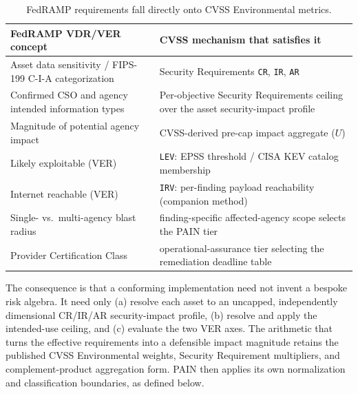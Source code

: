 \documentclass[11pt]{article}
\newcommand{\code}[1]{\texttt{#1}}
\begin{document}
\begin{table}[H]
\centering
\renewcommand{\arraystretch}{1.25}
\begin{tabular}{>{\raggedright\arraybackslash}p{} >{\raggedright\arraybackslash}p{}}
\toprule
\textbf{FedRAMP VDR/VER concept} & \textbf{CVSS mechanism that satisfies it} \\
\midrule
Asset data sensitivity / FIPS-199 C-I-A categorization & Security Requirements
\code{CR}, \code{IR}, \code{AR} \\
Confirmed CSO and agency intended information types & Per-objective Security
Requirements ceiling over the asset security-impact profile \\
Magnitude of potential agency impact & CVSS-derived pre-cap impact aggregate ($U$) \\
Likely exploitable (VER) & \code{LEV}: EPSS threshold / CISA KEV catalog membership \\
Internet reachable (VER) & \code{IRV}: per-finding payload reachability (companion method) \\
Single- vs.\ multi-agency blast radius & finding-specific affected-agency scope
selects the PAIN tier \\
Provider Certification Class & operational-assurance tier selecting the remediation
deadline table \\
\bottomrule
\end{tabular}
\caption{FedRAMP requirements fall directly onto CVSS Environmental metrics.}
\end{table}

The consequence is that a conforming implementation need not invent a bespoke
risk algebra. It need only (a) resolve each asset to an uncapped, independently
dimensional CR/IR/AR security-impact profile,
(b) resolve and apply the intended-use ceiling, and (c) evaluate the two VER axes.
The arithmetic that turns the effective requirements into a defensible impact
magnitude retains the published CVSS Environmental weights, Security Requirement
multipliers, and complement-product aggregation form. PAIN then applies its own
normalization and classification boundaries, as defined below.
\end{document}
